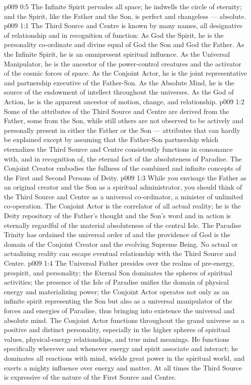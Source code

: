 \vs p009 0:5 \pc The Infinite Spirit pervades all space; he indwells the circle of eternity; and the Spirit, like the Father and the Son, is perfect and changeless --- absolute.
\vs p009 1:1 The Third Source and Centre is known by many names, all designative of relationship and in recognition of function: As God the Spirit, he is the personality co\hyp{}ordinate and divine equal of God the Son and God the Father. As the Infinite Spirit, he is an omnipresent spiritual influence. As the Universal Manipulator, he is the ancestor of the power\hyp{}control creatures and the activator of the cosmic forces of space. As the Conjoint Actor, he is the joint representative and partnership executive of the Father\hyp{}Son. As the Absolute Mind, he is the source of the endowment of intellect throughout the universes. As the God of Action, he is the apparent ancestor of motion, change, and relationship.
\vs p009 1:2 Some of the attributes of the Third Source and Centre are derived from the Father, some from the Son, while still others are not observed to be actively and personally present in either the Father or the Son --- attributes that can hardly be explained except by assuming that the Father\hyp{}Son partnership which eternalizes the Third Source and Centre consistently functions in consonance with, and in recognition of, the eternal fact of the absoluteness of Paradise. The Conjoint Creator embodies the fullness of the combined and infinite concepts of the First and Second Persons of Deity.
\vs p009 1:3 \pc While you envisage the Father as an original creator and the Son as a spiritual administrator, you should think of the Third Source and Centre as a universal co\hyp{}ordinator, a minister of unlimited co\hyp{}operation. The Conjoint Actor is the correlator of all actual reality; he is the Deity repository of the Father’s thought and the Son’s word and in action is eternally regardful of the material absoluteness of the central Isle. The Paradise Trinity has ordained the universal order of  and the providence of God is the domain of the Conjoint Creator and the evolving Supreme Being. No actual or actualizing reality can escape eventual relationship with the Third Source and Centre.
\vs p009 1:4 \pc The Universal Father presides over the realms of pre\hyp{}energy, prespirit, and personality; the Eternal Son dominates the spheres of spiritual activities; the presence of the Isle of Paradise unifies the domain of physical energy and materializing power; the Conjoint Actor operates not only as an infinite spirit representing the Son but also as a universal manipulator of the forces and energies of Paradise, thus bringing into existence the universal and absolute mind. The Conjoint Actor functions throughout the grand universe as a positive and distinct personality, especially in the higher spheres of spiritual values, physical\hyp{}energy relationships, and true mind meanings. He functions specifically wherever and whenever energy and spirit associate and interact; he dominates all reactions with mind, wields great power in the spiritual world, and exerts a mighty influence over energy and matter. At all times the Third Source is expressive of the nature of the First Source and Centre.
